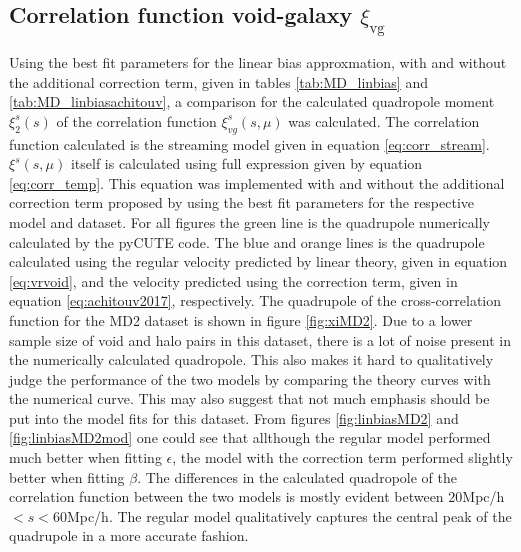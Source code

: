 \subsection{Correlation function void-galaxy $\xi_{\mathrm{vg}}$}
Using the best fit parameters for the linear bias approxmation, with and without the additional correction term, given in tables \ref{tab:MD_linbias} and \ref{tab:MD_linbiasachitouv}, a comparison for the calculated quadropole moment $\xi_2^s(s)$ of the correlation function $\xi_{vg}^s(s,\mu)$ was calculated. The correlation function calculated is the streaming model given in equation \ref{eq:corr_stream}. $\xi^s(s,\mu)$ itself is calculated using full expression given by equation \ref{eq:corr_temp}. This equation was implemented with and without the additional correction term proposed by \cite{Achitouv_streaming} using the best fit parameters for the respective model and dataset. For all figures the green line is the quadrupole numerically calculated by the pyCUTE code. The blue and orange lines is the quadrupole calculated using the regular velocity predicted by linear theory, given in equation \ref{eq:vrvoid}, and the velocity predicted using the correction term, given in equation \ref{eq:achitouv2017}, respectively. The quadrupole of the cross-correlation function for the MD2 dataset is shown in figure \ref{fig:xiMD2}. Due to a lower sample size of void and halo pairs in this dataset, there is a lot of noise present in the numerically calculated quadropole. This also makes it hard to qualitatively judge the performance of the two models by comparing the theory curves with the numerical curve. This may also suggest that not much emphasis should be put into the model fits for this dataset. From figures \ref{fig:linbiasMD2} and \ref{fig:linbiasMD2mod} one could see that allthough the regular model performed much better when fitting $\epsilon$, the model with the correction term performed slightly better when fitting $\beta$. The differences in the calculated quadropole of the correlation function between the two models is mostly evident between $20$Mpc/h$<s<60$Mpc/h. The regular model qualitatively captures the central peak of the quadrupole in a more accurate fashion.\\\indent
